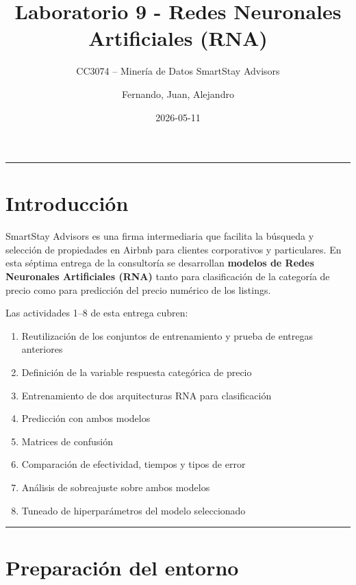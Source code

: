 \documentclass[
]{article}
\title{Laboratorio 9 - Redes Neuronales Artificiales (RNA)}
\subtitle{CC3074 -- Minería de Datos \textbar{} SmartStay Advisors}
\author{Fernando, Juan, Alejandro}
\date{2026-05-11}
\providecommand{\tightlist}{%
  \setlength{\itemsep}{0pt}\setlength{\parskip}{0pt}}
\begin{document}
\maketitle

{
\setcounter{tocdepth}{3}
\tableofcontents
}
\begin{center}\rule{0.5\linewidth}{0.5pt}\end{center}

\section{Introducción}\label{introducciuxf3n}

SmartStay Advisors es una firma intermediaria que facilita la búsqueda y
selección de propiedades en Airbnb para clientes corporativos y
particulares. En esta séptima entrega de la consultoría se desarrollan
\textbf{modelos de Redes Neuronales Artificiales (RNA)} tanto para
clasificación de la categoría de precio como para predicción del precio
numérico de los listings.

Las actividades 1--8 de esta entrega cubren:

\begin{enumerate}
\def\labelenumi{\arabic{enumi}.}
\tightlist
\item
  Reutilización de los conjuntos de entrenamiento y prueba de entregas
  anteriores
\item
  Definición de la variable respuesta categórica de precio
\item
  Entrenamiento de dos arquitecturas RNA para clasificación
\item
  Predicción con ambos modelos
\item
  Matrices de confusión
\item
  Comparación de efectividad, tiempos y tipos de error
\item
  Análisis de sobreajuste sobre ambos modelos
\item
  Tuneado de hiperparámetros del modelo seleccionado
\end{enumerate}

\begin{center}\rule{0.5\linewidth}{0.5pt}\end{center}

\section{Preparación del entorno}\label{preparaciuxf3n-del-entorno}
\end{document}
